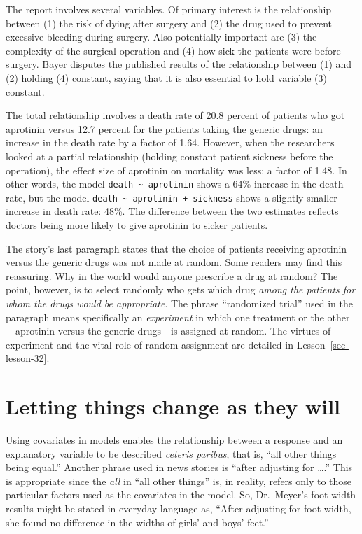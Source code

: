\documentclass[
  letterpaper,
  DIV=11,
  numbers=noendperiod,
  oneside]{scrreprt}
\begin{document}
\begin{tcolorbox}
The report involves several variables. Of primary interest is the
relationship between (1) the risk of dying after surgery and (2) the
drug used to prevent excessive bleeding during surgery. Also potentially
important are (3) the complexity of the surgical operation and (4) how
sick the patients were before surgery. Bayer disputes the published
results of the relationship between (1) and (2) holding (4) constant,
saying that it is also essential to hold variable (3) constant.

The total relationship involves a death rate of 20.8 percent of patients
who got aprotinin versus 12.7 percent for the patients taking the
generic drugs: an increase in the death rate by a factor of 1.64.
However, when the researchers looked at a partial relationship (holding
constant patient sickness before the operation), the effect size of
aprotinin on mortality was less: a factor of 1.48. In other words, the
model \texttt{death\ \textasciitilde{}\ aprotinin} shows a 64\% increase
in the death rate, but the model
\texttt{death\ \textasciitilde{}\ aprotinin\ +\ sickness} shows a
slightly smaller increase in death rate: 48\%. The difference between
the two estimates reflects doctors being more likely to give aprotinin
to sicker patients.

The story's last paragraph states that the choice of patients receiving
aprotinin versus the generic drugs was not made at random. Some readers
may find this reassuring. Why in the world would anyone prescribe a drug
at random? The point, however, is to select randomly who gets which drug
\emph{among the patients for whom the drugs would be appropriate}. The
phrase ``randomized trial'' used in the paragraph means specifically an
\emph{experiment} in which one treatment or the other---aprotinin versus
the generic drugs---is assigned at random. The virtues of experiment and
the vital role of random assignment are detailed in
Lesson~\ref{sec-lesson-32}.

\end{tcolorbox}

\hypertarget{letting-things-change-as-they-will}{%
\section{Letting things change as they
will}\label{letting-things-change-as-they-will}}

Using covariates in models enables the relationship between a response
and an explanatory variable to be described \emph{ceteris paribus}, that
is, ``all other things being equal.'' Another phrase used in news
stories is ``after adjusting for \ldots.'' This is appropriate since the
\emph{all} in ``all other things'' is, in reality, refers only to those
particular factors used as the covariates in the model. So, Dr.~Meyer's
foot width results might be stated in everyday language as, ``After
adjusting for foot width, she found no difference in the widths of
girls' and boys' feet.''
\end{document}
